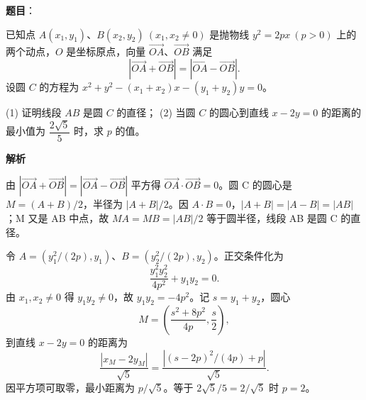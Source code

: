 \begin{answer}

\textbf{题目}：

已知点 $A(x_1,y_1)\text{、}B(x_2,y_2)\ (x_1,x_2\ne0)$ 是抛物线 $y^2=2px\ (p>0)$ 上的两个动点，$O$ 是坐标原点，向量 $\overrightarrow{OA}\text{、}\overrightarrow{OB}$ 满足
\nopagebreak[4]
\[
|\overrightarrow{OA}+\overrightarrow{OB}|=|\overrightarrow{OA}-\overrightarrow{OB}|.
\]
设圆 $C$ 的方程为 $x^2+y^2-(x_1+x_2)x-(y_1+y_2)y=0$。

(1) 证明线段 $AB$ 是圆 $C$ 的直径；
(2) 当圆 $C$ 的圆心到直线 $x-2y=0$ 的距离的最小值为 $\dfrac{2\sqrt5}{5}$ 时，求 $p$ 的值。

\textbf{解析}


由 $|\vec{OA}+\vec{OB}|=|\vec{OA}-\vec{OB}|$ 平方得 $\vec{OA}\cdot\vec{OB}=0$。圆 C 的圆心是 $M=(A+B)/2$，半径为 $|A+B|/2$。因 $A\cdot B=0$，$|A+B|=|A-B|=|AB|$；M 又是 AB 中点，故 $MA=MB=|AB|/2$ 等于圆半径，线段 AB 是圆 C 的直径。


令 $A=(y_1^2/(2p),y_1)$、$B=(y_2^2/(2p),y_2)$。正交条件化为
\nopagebreak[4]
\[
\frac{y_1^2y_2^2}{4p^2}+y_1y_2=0.
\]
由 $x_1,x_2\ne0$ 得 $y_1y_2\ne0$，故 $y_1y_2=-4p^2$。记 $s=y_1+y_2$，圆心
\nopagebreak[4]
\[
M=\left(\frac{s^2+8p^2}{4p},\frac{s}{2}\right),
\]
到直线 $x-2y=0$ 的距离为
\nopagebreak[4]
\[
\frac{|x_M-2y_M|}{\sqrt5}
=\frac{|(s-2p)^2/(4p)+p|}{\sqrt5}.
\]
因平方项可取零，最小距离为 $p/\sqrt5$。等于 $2\sqrt5/5=2/\sqrt5$ 时 $p=2$。



\end{answer}
